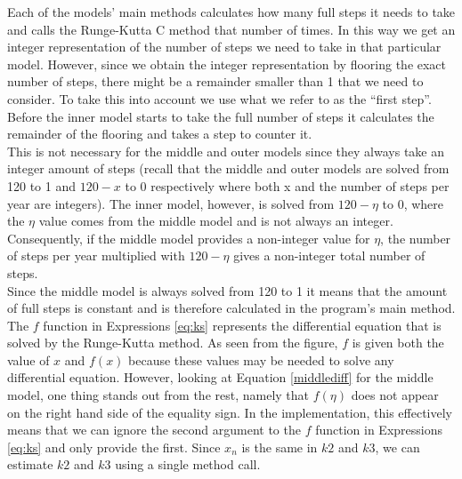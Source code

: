 Each of the models' main methods calculates how many full steps it needs to take and calls the Runge-Kutta C method that number of times. In this way we get an integer representation of the number of steps we need to take in that particular model. However, since we obtain the integer representation by flooring the exact number of steps, there might be a remainder smaller than 1 that we need to consider. To take this into account we use what we refer to as the ``first step''. Before the inner model starts to take the full number of steps it calculates the remainder of the flooring and takes a step to counter it. \\

This is not necessary for the middle and outer models since they always take an integer amount of steps (recall that the middle and outer models are solved from 120 to 1 and $120-x$ to 0 respectively where both x and the number of steps per year are integers). The inner model, however, is solved from $120-\eta$ to 0, where the $\eta$ value comes from the middle model and is not always an integer. Consequently, if the middle model provides a non-integer value for $\eta$, the number of steps per year multiplied with $120-\eta$ gives a non-integer total number of steps. \\

Since the middle model is always solved from 120 to 1 it means that the amount of full steps is constant and is therefore calculated in the program's main method. \\

The $f$ function in Expressions \ref{eq:ks} represents the differential equation that is solved by the Runge-Kutta method. As seen from the figure, $f$ is given both the value of $x$ and $f(x)$ because these values may be needed to solve any differential equation. However, looking at Equation \ref{middlediff} for the middle model, one thing stands out from the rest, namely that $f(\eta)$ does not appear on the right hand side of the equality sign. In the implementation, this effectively means that we can ignore the second argument to the $f$ function in Expressions \ref{eq:ks} and only provide the first. Since $x_n$ is the same in $k2$ and $k3$, we can estimate $k2$ and $k3$ using a single method call. 














